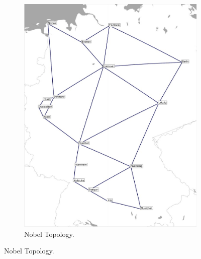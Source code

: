 \begin{figure}
    \centering
    \begin{subfigure}{0.475\textwidth}
        \includegraphics[width=\textwidth]{figs/methodology/nobel-germany.jpg}
        \caption{Nobel Topology.}
    \end{subfigure}
    

\end{figure}
